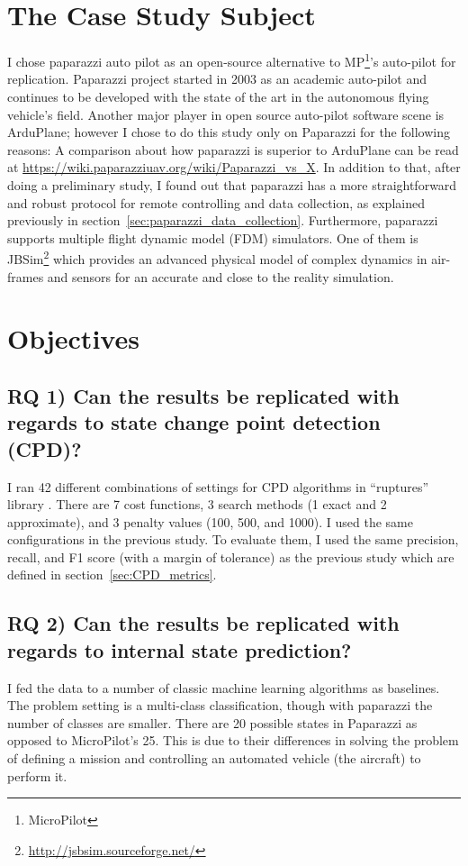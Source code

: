 \section{The Case Study Subject}
I chose paparazzi auto pilot as an open-source alternative to MP\footnote{MicroPilot}'s auto-pilot for replication. Paparazzi \cite{hattenberger2014using} project started in 2003 as an academic auto-pilot and continues to be developed with the state of the art in the autonomous flying vehicle's field. Another major player in open source auto-pilot software scene is ArduPlane; however I chose to do this study only on Paparazzi for the following reasons:
A comparison about how paparazzi is superior to ArduPlane can be read at \url{https://wiki.paparazziuav.org/wiki/Paparazzi_vs_X}. 
In addition to that, after doing a preliminary study, I found out that paparazzi has a more straightforward and robust protocol for remote controlling and data collection, as explained previously in section~\ref{sec:paparazzi_data_collection}. 
Furthermore, paparazzi supports multiple flight dynamic model (FDM) simulators. One of them is JBSim\footnote{\url{http://jsbsim.sourceforge.net/}} which provides an advanced physical model of complex dynamics in air-frames and sensors for an accurate and close to the reality simulation. 


\section{Objectives}
\subsection{RQ 1) Can the results be replicated with regards to state change point detection (CPD)?}
I ran 42 different combinations of settings for CPD algorithms in ``ruptures'' library \cite{Truong2018ChangePointSurvey}. 
There are 7 cost functions, 3 search methods (1 exact and 2 approximate), and 3 penalty values (100, 500, and 1000).
I used the same configurations in the previous study. 
To evaluate them, I used the same precision, recall, and F1 score (with a margin of tolerance) as the previous study which are defined in section~\ref{sec:CPD_metrics}.

\subsection{RQ 2) Can the results be replicated with regards to internal state prediction?}
I fed the data to a number of classic machine learning algorithms as baselines. The problem setting is a multi-class classification, though with paparazzi the number of classes are smaller. 
There are 20 possible states in Paparazzi as opposed to MicroPilot's 25. This is due to their differences in solving the problem of defining a mission and controlling an automated vehicle (the aircraft) to perform it.

